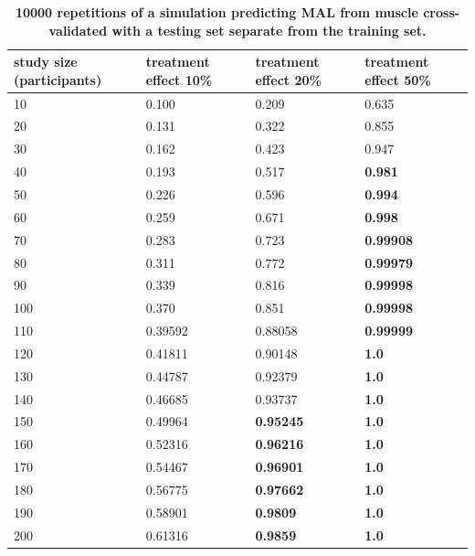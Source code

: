 \documentclass[10pt,letterpaper]{article}
\begin{document}
\begin{table}[!ht]
\begin{adjustwidth}{-2.25in}{0in} %
\centering
\caption{{\bf 10000 repetitions of a simulation predicting MAL from muscle cross-validated with a testing set separate from the training set.}}

\begin{tabular}{|l|l|l|l|}
\hline
study size (participants) & treatment effect 10\% & treatment effect 20\% & treatment effect 50\%  \\ \hline
10 & 0.100 & 0.209 & 0.635 \\ \hline
20 & 0.131 & 0.322 & 0.855 \\ \hline
30 & 0.162 & 0.423 & 0.947 \\ \hline
40 & 0.193 & 0.517 & {\bf 0.981} \\ \hline
50 & 0.226 & 0.596 & {\bf 0.994} \\ \hline
60 & 0.259 & 0.671 & {\bf 0.998} \\ \hline 
70 & 0.283 & 0.723 & {\bf 0.99908} \\ \hline
80 & 0.311 & 0.772 & {\bf 0.99979} \\ \hline
90 & 0.339 & 0.816 & {\bf 0.99998} \\ \hline
100 & 0.370 & 0.851 & {\bf 0.99998} \\ \hline
110 & 0.39592 & 0.88058 & {\bf 0.99999} \\ \hline
120 & 0.41811 & 0.90148 & {\bf 1.0} \\ \hline
130 & 0.44787 & 0.92379 & {\bf 1.0} \\ \hline
140 & 0.46685 & 0.93737 & {\bf 1.0} \\ \hline
150 & 0.49964 & {\bf 0.95245} & {\bf 1.0} \\ \hline
160 & 0.52316 & {\bf 0.96216} & {\bf 1.0} \\ \hline
170 & 0.54467 & {\bf 0.96901} & {\bf 1.0} \\ \hline
180 & 0.56775 & {\bf 0.97662} & {\bf 1.0} \\ \hline
190 & 0.58901 & {\bf 0.9809} & {\bf 1.0} \\ \hline
200 & 0.61316 & {\bf 0.9859} & {\bf 1.0} \\ \hline
\end{tabular}

\label{power_table}
\end{adjustwidth}
\end{table}
\end{document}
